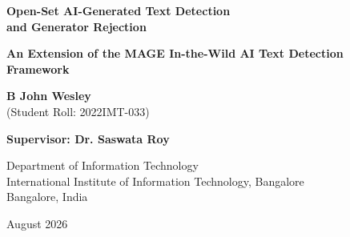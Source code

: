 \documentclass[12pt,a4paper]{report}
\begin{document}
\begin{titlepage}
    \centering
    \vspace*{1.5cm}
    
    {\Huge \bfseries Open-Set AI-Generated Text Detection\\ and Generator Rejection\par}
    \vspace{0.5cm}
    {\large \bfseries An Extension of the MAGE In-the-Wild AI Text Detection Framework\par}
    
    \vspace{2.5cm}
    
    {\large \textbf{B John Wesley} \\ (Student Roll: 2022IMT-033)\par}
    
    \vspace{1.5cm}
    
    {\large \textbf{Supervisor: Dr. Saswata Roy}\par}
    
    \vspace{2.5cm}
    
    \vspace{0.5cm}
    
    {\large Department of Information Technology \\
    International Institute of Information Technology, Bangalore \\
    Bangalore, India\par}
    
    \vspace{1.5cm}
    
    {\large August 2026\par}
\end{titlepage}

\newpage
\end{document}
